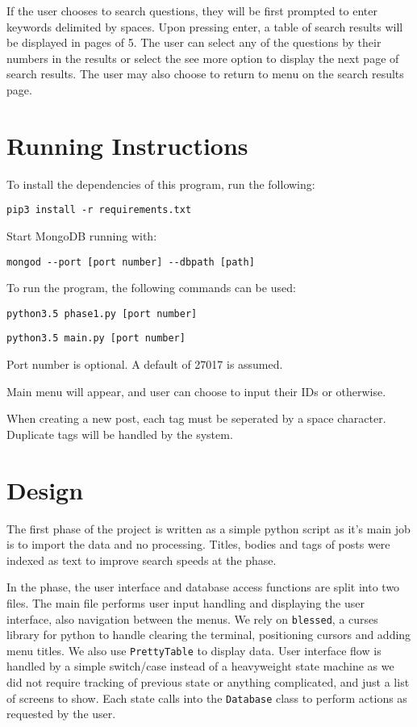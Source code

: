 \documentclass{article}
\begin{document}
If the user chooses to search questions, they will be first prompted to enter keywords delimited by spaces. Upon pressing enter, a table of search results will be displayed in pages of 5. The user can select any of the questions by their numbers in the results or select the see more option to display the next page of search results. The user may also choose to return to menu on the search results page.

\section{Running Instructions}

To install the dependencies of this program, run the following:

\verb|pip3 install -r requirements.txt|

Start MongoDB running with:

\verb|mongod --port [port number] --dbpath [path]|

To run the program, the following commands can be used:

\verb|python3.5 phase1.py [port number]|

\verb|python3.5 main.py [port number]|

Port number is optional. A default of 27017 is assumed.

Main menu will appear, and user can choose to input their IDs or otherwise.

When creating a new post, each tag must be seperated by a space character. Duplicate tags will be handled by the system.

\section{Design}

The first phase of the project is written as a simple python script as it's main job is to import the data and no processing. Titles, bodies and tags of posts were indexed as text to improve search speeds at the  phase.

In the  phase, the user interface and database access functions are split into two files. The main file performs user input handling and displaying the user interface, also navigation between the menus. We rely on \verb|blessed|, a curses library for python to handle clearing the terminal, positioning cursors and adding menu titles. We also use \verb|PrettyTable| to display data. User interface flow is handled by a simple switch/case instead of a heavyweight state machine as we did not require tracking of previous state or anything complicated, and just a list of screens to show. Each state calls into the \verb|Database| class to perform actions as requested by the user.
\end{document}
